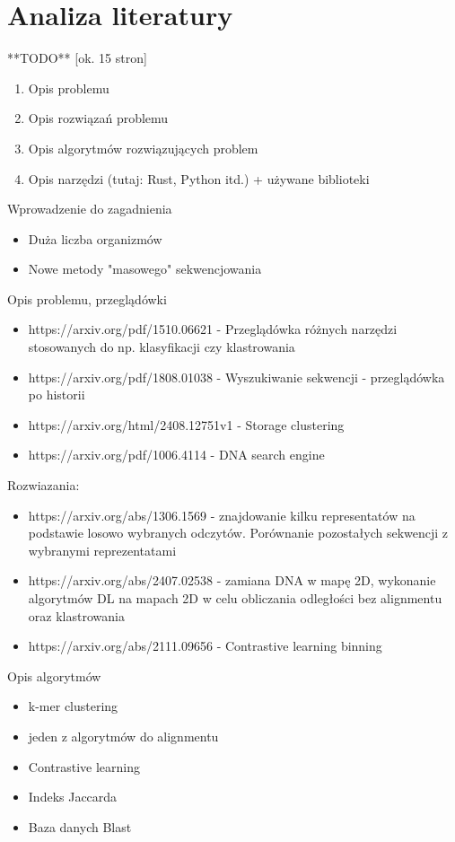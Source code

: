 \clearpage
\section{Analiza literatury}

**TODO** [ok. 15 stron]

\begin{enumerate}
    \item Opis problemu
    \item Opis rozwiązań problemu
    \item Opis algorytmów rozwiązujących problem
    \item Opis narzędzi (tutaj: Rust, Python itd.) + używane biblioteki
\end{enumerate}

Wprowadzenie do zagadnienia
\begin{itemize}
    \item Duża liczba organizmów
    \item Nowe metody "masowego" sekwencjowania
\end{itemize}

Opis problemu, przeglądówki
\begin{itemize}
    \item https://arxiv.org/pdf/1510.06621 - Przeglądówka różnych narzędzi stosowanych do np. klasyfikacji czy klastrowania
    \item https://arxiv.org/pdf/1808.01038 - Wyszukiwanie sekwencji - przeglądówka po historii
    \item https://arxiv.org/html/2408.12751v1 - Storage clustering
    \item https://arxiv.org/pdf/1006.4114 - DNA search engine
\end{itemize}

Rozwiazania:
\begin{itemize}
    \item https://arxiv.org/abs/1306.1569 - znajdowanie kilku representatów na podstawie losowo wybranych odczytów. Porównanie pozostałych sekwencji z wybranymi reprezentatami
    \item https://arxiv.org/abs/2407.02538 - zamiana DNA w mapę 2D, wykonanie algorytmów DL na mapach 2D w celu obliczania odległości bez alignmentu oraz klastrowania
    \item https://arxiv.org/abs/2111.09656 - Contrastive learning binning
\end{itemize}

Opis algorytmów
\begin{itemize}
    \item k-mer clustering
    \item jeden z algorytmów do alignmentu
    \item Contrastive learning
    \item Indeks Jaccarda
    \item Baza danych Blast
\end{itemize}